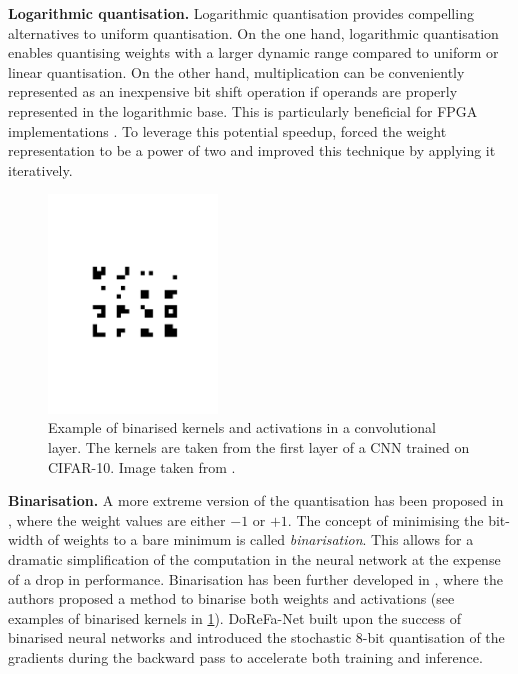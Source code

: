 \noindent\textbf{Logarithmic quantisation.} Logarithmic quantisation provides
compelling alternatives to uniform quantisation. On the one hand, logarithmic
quantisation enables quantising weights with a larger dynamic range compared to
uniform or linear quantisation. On the other hand, multiplication can be
conveniently represented as an inexpensive bit shift operation if operands are
properly represented in the logarithmic base. This is particularly beneficial
for \ac{FPGA} implementations \cite{alemdar2017ternary}. To leverage this
potential speedup, \cite{DBLP:journals/corr/LinCMB15} forced the weight
representation to be a power of two and \cite{DBLP:conf/iclr/ZhouYGXC17}
improved this technique by applying it iteratively.\\

\begin{figure}[htbp]
  \centering
  \includegraphics[width=0.40\textwidth,trim=5cm 9cm 5cm 9cm, clip]{chapter_sota/assets/binarised_kernels.pdf}
  \caption{Example of binarised kernels and activations in a convolutional
    layer. The kernels are taken from the first layer of a \ac{CNN} trained on CIFAR-10.
    Image taken from \cite{DBLP:conf/nips/HubaraCSEB16}.}
  \label{fig:sota:binarised_kernels}
\end{figure}

\noindent\textbf{Binarisation.} A more extreme version of the quantisation has
been proposed in \cite{courbariaux2015binaryconnect}, where the weight values
are either $-1$ or $+1$. The concept of minimising the bit-width of weights to a
bare minimum is called \emph{binarisation}. This allows for a dramatic
simplification of the computation in the neural network at the expense of a drop
in performance. Binarisation has been further developed in
\cite{DBLP:conf/nips/HubaraCSEB16}, where the authors proposed a method to
binarise both weights and activations (see examples of binarised kernels in
\cref{fig:sota:binarised_kernels}). DoReFa-Net \cite{zhou2016dorefa} built upon
the success of binarised neural networks and introduced the stochastic 8-bit
quantisation of the gradients during the backward pass to accelerate both
training and inference.\\

